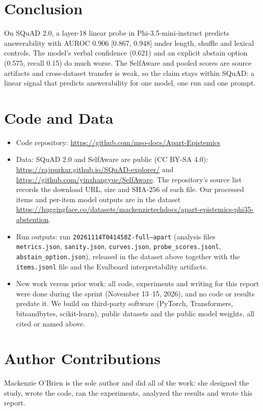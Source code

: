 \documentclass[10pt]{article}
\newcommand{\code}[1]{\texttt{#1}}
\begin{document}
\section{Conclusion}
On SQuAD 2.0, a layer-18 linear probe in Phi-3.5-mini-instruct predicts answerability with AUROC 0.906 [0.867, 0.948] under length, shuffle and lexical controls. The model's verbal confidence (0.621) and an explicit abstain option (0.575, recall 0.15) do much worse. The SelfAware and pooled scores are source artifacts and cross-dataset transfer is weak, so the claim stays within SQuAD: a linear signal that predicts answerability for one model, one run and one prompt.

\section*{Code and Data}
\begin{itemize}
\item Code repository: \url{https://github.com/mso-docs/Apart-Epistemics}
\item Data: SQuAD 2.0 \citep{rajpurkar2018squad2} and SelfAware \citep{yin2023selfaware} are public (CC BY-SA 4.0): \url{https://rajpurkar.github.io/SQuAD-explorer/} and \url{https://github.com/yinzhangyue/SelfAware}. The repository's source list records the download URL, size and SHA-256 of each file. Our processed items and per-item model outputs are in the dataset \url{https://huggingface.co/datasets/mackenzietechdocs/apart-epistemics-phi35-abstention}.
\item Run outputs: run \code{20261114T041458Z-full--apart} (analysis files \code{metrics.json}, \code{sanity.json}, \code{curves.json}, \code{probe\_scores.jsonl}, \code{abstain\_option.json}), released in the dataset above together with the \code{items.jsonl} file and the Evalboard interpretability artifacts.
\item New work versus prior work: all code, experiments and writing for this report were done during the sprint (November 13--15, 2026), and no code or results predate it. We build on third-party software (PyTorch, Transformers, bitsandbytes, scikit-learn), public datasets and the public model weights, all cited or named above.
\end{itemize}

\section*{Author Contributions}
Mackenzie O'Brien is the sole author and did all of the work: she designed the study, wrote the code, ran the experiments, analyzed the results and wrote this report.
\end{document}

